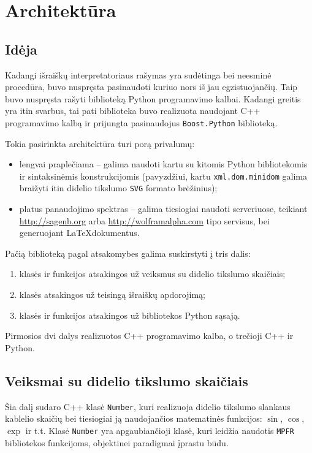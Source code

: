 \chapter{Architektūra}

\section{Idėja}

Kadangi išraiškų interpretatoriaus rašymas yra sudėtinga bei neesminė
procedūra, buvo nuspręsta pasinaudoti kuriuo nors iš jau egzistuojančių.
Taip buvo nuspręsta rašyti biblioteką Python programavimo kalbai. Kadangi
greitis yra itin svarbus, tai pati biblioteka buvo realizuota naudojant
C++ programavimo kalbą ir prijungta pasinaudojus \verb|Boost.Python| 
\cite{boost_python} biblioteką.

Tokia pasirinkta architektūra turi porą privalumų:
\begin{itemize}
  \item lengvai praplečiama – galima naudoti kartu su kitomis Python 
    bibliotekomis ir sintaksinėmis konstrukcijomis (pavyzdžiui, kartu
    \verb|xml.dom.minidom| galima braižyti itin didelio tikslumo 
    \verb|SVG| \cite{svg} formato brėžinius);
  \item platus panaudojimo spektras – galima tiesiogiai naudoti
    serveriuose, teikiant \url{http://sagenb.org} 
    arba \url{http://wolframalpha.com} tipo servisus, bei
    generuojant \LaTeX dokumentus.
\end{itemize}

Pačią biblioteką pagal atsakomybes galima suskirstyti į tris dalis:
\begin{enumerate}
  \item klasės ir funkcijos atsakingos už veiksmus su didelio tikslumo
    skaičiais;
  \item klasės atsakingos už teisingą išraiškų apdorojimą;
  \item klasės ir funkcijos atsakingos už bibliotekos Python sąsają.
\end{enumerate}
Pirmosios dvi dalys realizuotos C++ programavimo kalba, o trečioji
C++ ir Python.

\section{Veiksmai su didelio tikslumo skaičiais}

Šia dalį sudaro C++ klasė \verb|Number|, kuri realizuoja didelio tikslumo
slankaus kablelio skaičių bei tiesiogiai ją naudojančios matematinės
funkcijos: $\sin$, $\cos$, $\exp$ ir t.t. Klasė \verb|Number| yra 
apgaubiančioji klasė, kuri leidžia naudotis \verb|MPFR| \cite{mpfr} 
bibliotekos funkcijoms, objektinei paradigmai įprastu būdu.

